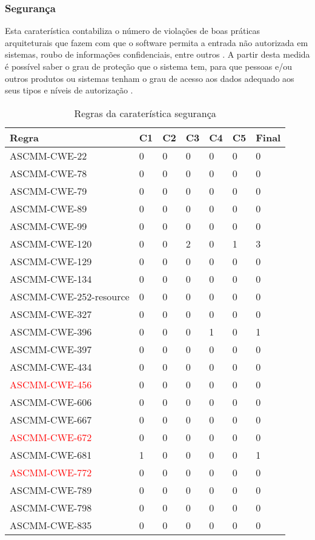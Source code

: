 \documentclass[openany,10pt,a4paper]{article}
\begin{document}
\subsubsection{Segurança}
Esta caraterística contabiliza o número de violações de boas práticas arquiteturais que fazem com que o software permita a entrada não autorizada em sistemas, roubo de informações confidenciais, entre outros \cite{OMG_Security}. A partir desta medida é possível saber o grau de proteção que o sistema tem, para que pessoas e/ou outros produtos ou sistemas tenham o grau de acesso aos dados adequado aos seus tipos e níveis de autorização \cite{security_iso}.
\begin{samepage}
\begin{longtable}{p{1.9in}|p{0.28in}|p{0.28in}|p{0.28in}|p{0.28in}|p{0.28in}|p{0.35in}}
		\caption{Regras da caraterística segurança}
		\label{table_security}
		\endhead
		\hline	
		\textbf{Regra} & \textbf{C1} & \textbf{C2} & \textbf{C3} & \textbf{C4} & \textbf{C5} & \textbf{Final} \\ \hline
		ASCMM-CWE-22 & 0 & 0 & 0 & 0 & 0 & 0 \\ \hline
		ASCMM-CWE-78 & 0 & 0 & 0 & 0 & 0 & 0 \\ \hline
		ASCMM-CWE-79 & 0 & 0 & 0 & 0 & 0 & 0 \\ \hline
		ASCMM-CWE-89 & 0 & 0 & 0 & 0 & 0 & 0 \\ \hline
		ASCMM-CWE-99 & 0 & 0 & 0 & 0 & 0 & 0 \\ \hline
		ASCMM-CWE-120 & 0 & 0 & 2 & 0 & 1 & 3 \\ \hline
		ASCMM-CWE-129 & 0 & 0 & 0 & 0 & 0 & 0 \\ \hline
		ASCMM-CWE-134 & 0 & 0 & 0 & 0 & 0 & 0 \\ \hline
		ASCMM-CWE-252-resource & 0 & 0 & 0 & 0 & 0 & 0 \\ \hline
		ASCMM-CWE-327 & 0 & 0 & 0 & 0 & 0 & 0 \\ \hline
		ASCMM-CWE-396 & 0 & 0 & 0 & 1 & 0 & 1 \\ \hline
		ASCMM-CWE-397 & 0 & 0 & 0 & 0 & 0 & 0 \\ \hline
		ASCMM-CWE-434 & 0 & 0 & 0 & 0 & 0 & 0 \\ \hline
		\textcolor{red}{ASCMM-CWE-456} & 0 & 0 & 0 & 0 & 0 & 0 \\ \hline
		ASCMM-CWE-606 & 0 & 0 & 0 & 0 & 0 & 0 \\ \hline
		ASCMM-CWE-667 & 0 & 0 & 0 & 0 & 0 & 0 \\ \hline
		\textcolor{red}{ASCMM-CWE-672} & 0 & 0 & 0 & 0 & 0 & 0 \\ \hline
		ASCMM-CWE-681 & 1 & 0 & 0 & 0 & 0 & 1 \\ \hline
		\textcolor{red}{ASCMM-CWE-772} & 0 & 0 & 0 & 0 & 0 & 0 \\ \hline
		ASCMM-CWE-789 & 0 & 0 & 0 & 0 & 0 & 0 \\ \hline
		ASCMM-CWE-798 & 0 & 0 & 0 & 0 & 0 & 0 \\ \hline
		ASCMM-CWE-835 & 0 & 0 & 0 & 0 & 0 & 0 \\ \hline
\end{longtable}
\end{samepage}
\end{document}
